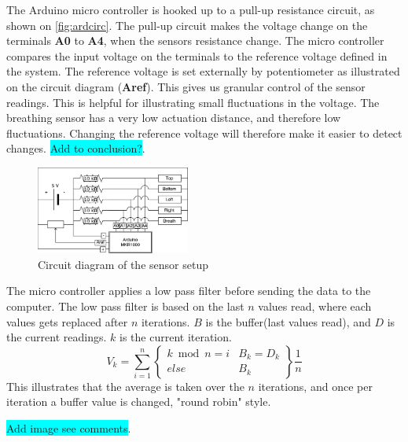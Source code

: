 \documentclass{sigchi-ext}
\begin{document}
The Arduino micro controller is hooked up to a pull-up resistance circuit, as shown on \autoref{fig:ardcirc}. The pull-up circuit makes the voltage change on the terminals \textbf{A0} to \textbf{A4}, when the sensors resistance change. 
The micro controller compares the input voltage on the terminals to the reference voltage defined in the system. The reference voltage is set externally by potentiometer as illustrated on the circuit diagram (\textbf{Aref}). This gives us granular control of the sensor readings. This is helpful for illustrating small fluctuations in the voltage. The breathing sensor has a very low actuation distance, and therefore low fluctuations. Changing the reference voltage will therefore make it easier to detect changes.  
\colorbox{cyan}{Add to conclusion?}.

\begin{figure} [H]
   \centering \includegraphics[width=0.45\textwidth]{img/arduino_diagram}
    \caption{Circuit diagram of the sensor setup}
    \label{fig:ardcirc}
\end{figure}

The micro controller applies a low pass filter before sending the data to the computer. The low pass filter is based on the last $n$ values read, where each values gets replaced after $n$ iterations. $B$ is the buffer(last values read), and $D$ is the current readings. $k$ is the current iteration.
$$
V_k= \sum\limits_{i=1}^n 
\left\{
\begin{array}{ll}
    k \bmod n = i & B_k = D_k\\
    else          & B_k
\end{array}\right\}\frac{1}{n}
$$
This illustrates that the average is taken over the $n$ iterations, and once per iteration a buffer value is changed, "round robin" style.


\colorbox{cyan}{Add image see comments}.
%
%
\end{document}

